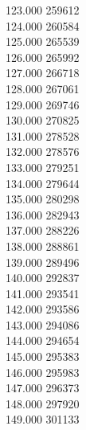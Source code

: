 { 123.000	259612 \\
 124.000	260584 \\
 125.000	265539 \\
 126.000	265992 \\
 127.000	266718 \\
 128.000	267061 \\
 129.000	269746 \\
 130.000	270825 \\
 131.000	278528 \\
 132.000	278576 \\
 133.000	279251 \\
 134.000	279644 \\
 135.000	280298 \\
 136.000	282943 \\
 137.000	288226 \\
 138.000	288861 \\
 139.000	289496 \\
 140.000	292837 \\
 141.000	293541 \\
 142.000	293586 \\
 143.000	294086 \\
 144.000	294654 \\
 145.000	295383 \\
 146.000	295983 \\
 147.000	296373 \\
 148.000	297920 \\
 149.000	301133 \\
}
